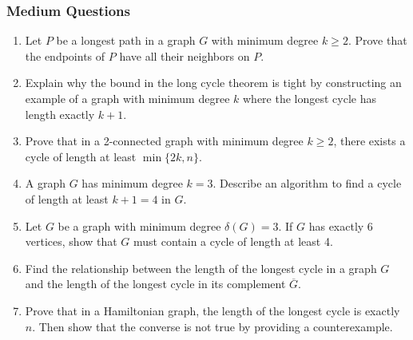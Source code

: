 \documentclass{article}
\theoremstyle{definition}
\begin{document}
\subsubsection{Medium Questions}
\begin{enumerate}[start=8]
\item Let $P$ be a longest path in a graph $G$ with minimum degree $k \geq 2$. Prove that the endpoints of $P$ have all their neighbors on $P$.

\item Explain why the bound in the long cycle theorem is tight by constructing an example of a graph with minimum degree $k$ where the longest cycle has length exactly $k+1$.

\item Prove that in a 2-connected graph with minimum degree $k \geq 2$, there exists a cycle of length at least $\min\{2k, n\}$.

\item A graph $G$ has minimum degree $k=3$. Describe an algorithm to find a cycle of length at least $k+1=4$ in $G$.

\item Let $G$ be a graph with minimum degree $\delta(G) = 3$. If $G$ has exactly 6 vertices, show that $G$ must contain a cycle of length at least 4.

\item Find the relationship between the length of the longest cycle in a graph $G$ and the length of the longest cycle in its complement $\overline{G}$.

\item Prove that in a Hamiltonian graph, the length of the longest cycle is exactly $n$. Then show that the converse is not true by providing a counterexample.
\end{enumerate}
\end{document}
